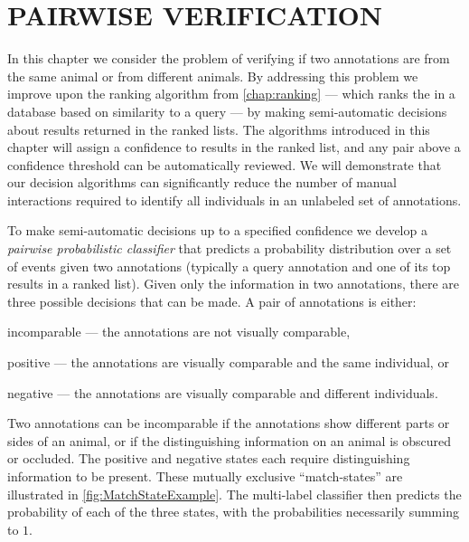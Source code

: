 
\begin{comment}
fixtex --reformat --fpaths chapter4-pairclf.tex --print
fixtex --fpaths chapter4-pairclf.tex --outline --asmarkdown --numlines=999 

fixtex --fpaths chapter4-pairclf.tex --outline --asmarkdown --numlines=999 --shortcite -w && ./checklang.py outline_chapter4-pairclf.md
https://www.languagetool.org/
\end{comment}

\newcommand{\nan}{\text{nan}}

\chapter{PAIRWISE VERIFICATION}\label{chap:pairclf}

In this chapter we consider the problem of verifying if two annotations are from the same animal or from different
animals. By addressing this problem we improve upon the ranking algorithm from \cref{chap:ranking} --- which ranks
the \names{} in a database based on similarity to a query --- by making semi-automatic decisions about results
returned in the ranked lists. The algorithms introduced in this chapter will assign a confidence to results in the
ranked list, and any pair above a confidence threshold can be automatically reviewed. We will demonstrate that our
decision algorithms can significantly reduce the number of manual interactions required to identify all individuals
in an unlabeled set of annotations.

To make semi-automatic decisions up to a specified confidence we develop a \emph{pairwise probabilistic
  classifier} that predicts a probability distribution over a set of events given two annotations (typically a
  query annotation and one of its top results in a ranked list).
Given only the information in two annotations,  there are three possible decisions that can be made.
A pair of annotations is either:
\begin{enumln}
    \item incomparable --- the annotations are not visually comparable,

    \item positive --- the annotations are visually comparable and the same individual, or

    \item negative --- the annotations are visually comparable and different individuals.
\end{enumln}
Two annotations can be incomparable if the annotations show different parts or sides of an animal, or if the
  distinguishing information on an animal is obscured or occluded.
The positive and negative states each require distinguishing information to be present.
These mutually exclusive ``match-states'' are illustrated in \cref{fig:MatchStateExample}.
The multi-label classifier then predicts the probability of each of the three states, with the probabilities
  necessarily summing to $1$.

